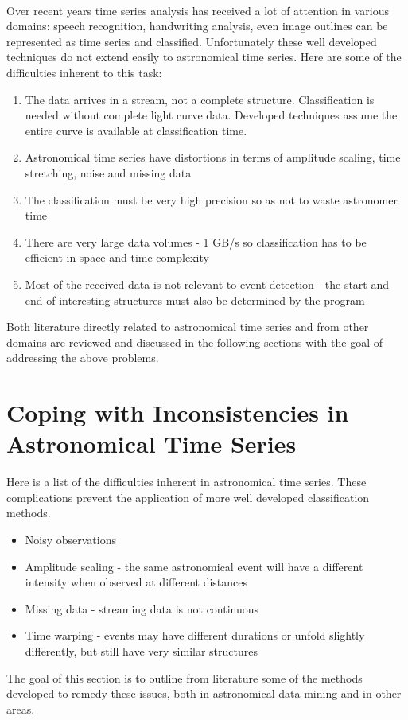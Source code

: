 \documentclass[11pt]{article}
\begin{document}
	\paragraph{}
	Over recent years time series analysis has received a lot of attention in various domains: speech recognition, handwriting analysis, even image outlines can be represented as time series and classified. Unfortunately these well developed techniques do not extend easily to astronomical time series. Here are some of the difficulties inherent to this task:
	\begin{enumerate}
		\item The data arrives in a stream, not a complete structure. Classification is needed without complete light curve data. Developed techniques assume the entire curve is available at classification time.
		\item Astronomical time series have distortions in terms of amplitude scaling, time stretching, noise and missing data
		\item The classification must be very high precision so as not to waste astronomer time
		\item There are very large data volumes - 1 GB/s so classification has to be efficient in space and time complexity
		\item Most of the received data is not relevant to event detection - the start and end of interesting structures must also be determined by the program
	\end{enumerate}
	Both literature directly related to astronomical time series and from other domains are reviewed and discussed in the following sections with the goal of addressing the above problems.
	
	\section{Coping with Inconsistencies in Astronomical Time Series}
	Here is a list of the difficulties inherent in astronomical time series. These complications prevent the application of more well developed classification methods.
	\begin{itemize}
		\item Noisy observations 
		\item Amplitude scaling - the same astronomical event will have a different intensity when observed at different distances
		\item Missing data - streaming data is not continuous
		\item Time warping - events may have different durations or unfold slightly differently, but still have very similar structures
	\end{itemize}
	The goal of this section is to outline from literature some of the methods developed to remedy these issues, both in astronomical data mining and in other areas.
	
\end{document}
